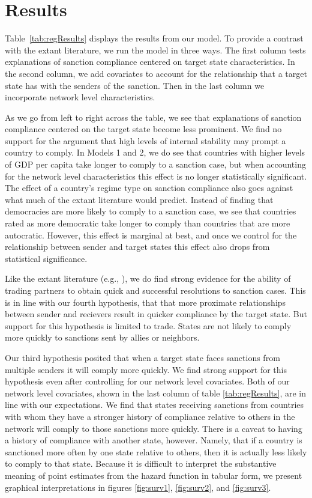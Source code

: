 \section*{Results}
\label{Results} 

Table~\ref{tab:regResults} displays the results from our model. To provide a contrast with the extant literature, we run the model in three ways. The first column tests explanations of sanction compliance centered on target state characteristics. In the second column, we add covariates to account for the relationship that a target state has with the senders of the sanction. Then in the last column we incorporate network level characteristics. 

As we go from left to right across the table, we see that explanations of sanction compliance centered on the target state become less prominent. We find no support for the argument that high levels of internal stability may prompt a country to comply. In Models 1 and 2, we do see that countries with higher levels of GDP per capita take longer to comply to a sanction case, but when accounting for the network level characteristics this effect is no longer statistically significant. The effect of a country's regime type on sanction compliance also goes against what much of the extant literature would predict. Instead of finding that democracies are more likely to comply to a sanction case, we see that countries rated as more democratic take longer to comply than countries that are more autocratic. However, this effect is marginal at best, and once we control for the relationship between sender and target states this effect also drops from statistical significance. 

Like the extant literature (e.g., \citealp{mclean2010friends}), we do find strong evidence for the ability of trading partners to obtain quick and successful resolutions to sanction cases. This is in line with our fourth hypothesis, that that more proximate relationships between sender and recievers result in quicker compliance by the target state. But support for this hypothesis is limited to trade. States are not likely to comply more quickly to sanctions sent by allies or neighbors. 


\FloatBarrier

Our third hypothesis posited that when a target state faces sanctions from multiple senders it will comply more quickly. We find strong support for this hypothesis even after controlling for our network level covariates. Both of our network level covariates, shown in the last column of table \ref{tab:regResults}, are in line with our expectations. We find that states receiving sanctions from countries with whom they have a stronger history of compliance relative to others in the network will comply to those sanctions more quickly. There is a caveat to having a history of compliance with another state, however. Namely, that if a country is sanctioned more often by one state relative to others, then it is actually less likely to comply to that state. Because it is difficult to interpret the substantive meaning of point estimates from the hazard function in tabular form, we present graphical interpretations in figures \ref{fig:surv1}, \ref{fig:surv2}, and \ref{fig:surv3}. 

